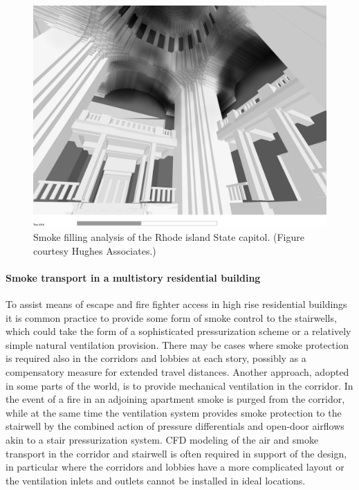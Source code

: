 \documentclass[graybox]{svmult}
\begin{document}
\begin{figure}[ht]
\includegraphics[width=\textwidth]{Fig_dome}
\caption{Smoke filling analysis of the Rhode island State capitol. (Figure courtesy Hughes Associates.)}
\label{Dome}
\end{figure}




\paragraph{Smoke transport in a multistory residential building}

To assist means of escape and fire fighter access in high rise residential buildings it is common practice to provide some form of smoke control to the stairwells, which could take the form of a sophisticated pressurization scheme or a relatively simple natural ventilation provision. There may be cases where smoke protection is required also in the corridors and lobbies at each story, possibly as a compensatory measure for extended travel distances. Another approach, adopted in some parts of the world, is to provide mechanical ventilation in the corridor. In the event of a fire in an adjoining apartment smoke is purged from the corridor, while at the same time the ventilation system provides smoke protection to the stairwell by the combined action of pressure differentials and open-door airflows akin to a stair pressurization system. CFD modeling of the air and smoke transport in the corridor and stairwell is often required in support of the design, in particular where the corridors and lobbies have a more complicated layout or the ventilation inlets and outlets cannot be installed in ideal locations.
\end{document}
